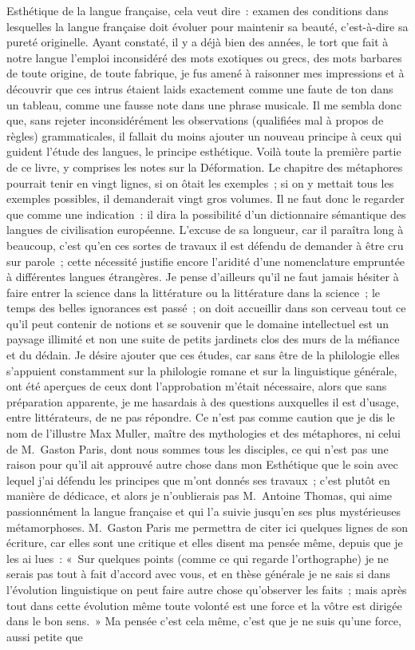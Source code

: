 \documentclass[french,twoside]{book} %
\newcommand{\bibl}[1]{{\RaggedLeft{#1}\par\bigskip}}
\begin{document}
\bibl{{\scshape Malherbe}.}
\noindent Esthétique de la langue française, cela veut dire : examen des conditions dans lesquelles la langue française doit évoluer pour maintenir sa beauté, c’est-à-dire sa pureté originelle. Ayant constaté, il y a déjà bien des années, le tort que fait à notre langue l’emploi inconsidéré des mots exotiques ou grecs, des mots barbares de toute origine, de toute fabrique, je fus amené à raisonner mes impressions et à découvrir que ces intrus étaient laids exactement comme une faute de ton dans un tableau, comme une fausse note dans une phrase musicale. Il me sembla donc que, sans rejeter inconsidérément les observations (qualifiées mal à propos de règles) grammaticales, il fallait du moins ajouter un nouveau principe à ceux qui guident l’étude des langues, le principe esthétique. Voilà toute la première partie de ce livre, y comprises les notes sur la Déformation. Le chapitre des métaphores pourrait tenir en vingt lignes, si on ôtait les exemples ; si on y mettait tous les exemples possibles, il demanderait vingt gros volumes. Il ne faut donc le regarder que comme une indication : il dira la possibilité d’un dictionnaire sémantique des langues de civilisation européenne. L’excuse de sa longueur, car il paraîtra long à beaucoup, c’est qu’en ces sortes de travaux il est défendu de demander à être cru sur parole ; cette nécessité justifie encore l’aridité d’une nomenclature empruntée à différentes langues étrangères. Je pense d’ailleurs qu’il ne faut jamais hésiter à faire entrer la science dans la littérature ou la littérature dans la science ; le temps des belles ignorances est passé ; on doit accueillir dans son cerveau tout ce qu’il peut contenir de notions et se souvenir que le domaine intellectuel est un paysage illimité et non une suite de petits jardinets clos des murs de la méfiance et du dédain. Je désire ajouter que ces études, car sans être de la philologie elles s’appuient constamment sur la philologie romane et sur la linguistique générale, ont été aperçues de ceux dont l’approbation m’était nécessaire, alors que sans préparation apparente, je me hasardais à des questions auxquelles il est d’usage, entre littérateurs, de ne pas répondre. Ce n’est pas comme caution que je dis le nom de l’illustre Max Muller, maître des mythologies et des métaphores, ni celui de M. Gaston Paris, dont nous sommes tous les disciples, ce qui n’est pas une raison pour qu’il ait approuvé autre chose dans mon Esthétique que le soin avec lequel j’ai défendu les principes que m’ont donnés ses travaux ; c’est plutôt en manière de dédicace, et alors je n’oublierais pas M. Antoine Thomas, qui aime passionnément la langue française et qui l’a suivie jusqu’en ses plus mystérieuses métamorphoses. M. Gaston Paris me permettra de citer ici quelques lignes de son écriture, car elles sont une critique et elles disent ma pensée même, depuis que je les ai lues : « Sur quelques points (comme ce qui regarde l’orthographe) je ne serais pas tout à fait d’accord avec vous, et en thèse générale je ne sais si dans l’évolution linguistique on peut faire autre chose qu’observer les faits ; mais après tout dans cette évolution même toute volonté est une force et la vôtre est dirigée dans le bon sens. » Ma pensée c’est cela même, c’est que je ne suis qu’une force, aussi petite que 
\end{document}
